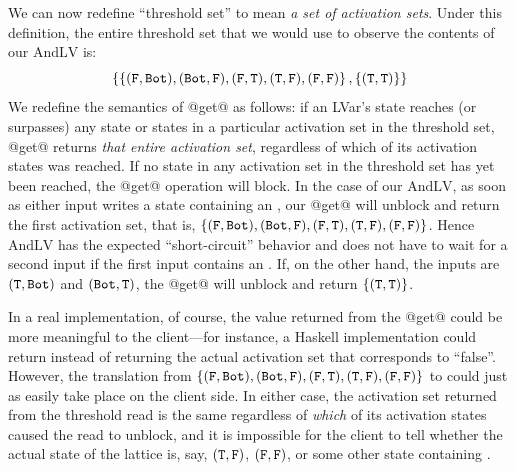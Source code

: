 We can now redefine ``threshold set'' to mean \emph{a set of
  activation sets}.  Under this definition, the entire threshold set
that we would use to observe the contents of our $\mathrm{AndLV}$ is:
\[
\left\{
  \left\{ (\texttt{F},\texttt{Bot}), (\texttt{Bot},\texttt{F}), (\texttt{F},\texttt{T}), (\texttt{T},\texttt{F}), (\texttt{F},\texttt{F}) \right\},
  \left\{ (\texttt{T},\texttt{T}) \right\}
\right\}
\]
We redefine the semantics of @get@ as follows: if an LVar's state
reaches (or surpasses) any state or states in a particular activation
set in the threshold set, @get@ returns \emph{that entire activation
  set}, regardless of which of its activation states was reached. If
no state in any activation set in the threshold set has yet been
reached, the @get@ operation will block.  In the case of our
$\mathrm{AndLV}$, as soon as either input writes a state containing an
, our @get@ will unblock and return the first activation set,
that is, $\left\{ (\texttt{F},\texttt{Bot}), (\texttt{Bot},\texttt{F}), (\texttt{F},\texttt{T}),
  (\texttt{T},\texttt{F}), (\texttt{F},\texttt{F}) \right\}$.  Hence $\mathrm{AndLV}$ has the
expected ``short-circuit'' behavior and does not have to wait for a
second input if the first input contains an .  If, on the other
hand, the inputs are $(\texttt{T},\texttt{Bot})$ and $(\texttt{Bot},\texttt{T})$, the @get@
will unblock and return $\left\{ (\texttt{T},\texttt{T}) \right\}$.

In a real implementation, of course, the value returned from the @get@
could be more meaningful to the client---for instance, a Haskell
implementation could return  instead of returning the actual
activation set that corresponds to ``false''.  However, the
translation from $\left\{ (\texttt{F},\texttt{Bot}), (\texttt{Bot},\texttt{F}),
  (\texttt{F},\texttt{T}), (\texttt{T},\texttt{F}), (\texttt{F},\texttt{F}) \right\}$ to  could just
as easily take place on the client side.  In either case, the
activation set returned from the threshold read is the same regardless
of \emph{which} of its activation states caused the read to unblock,
and it is impossible for the client to tell whether the actual state
of the lattice is, say, $(\texttt{T},\texttt{F})$, $(\texttt{F},\texttt{F})$, or some other
state containing .

